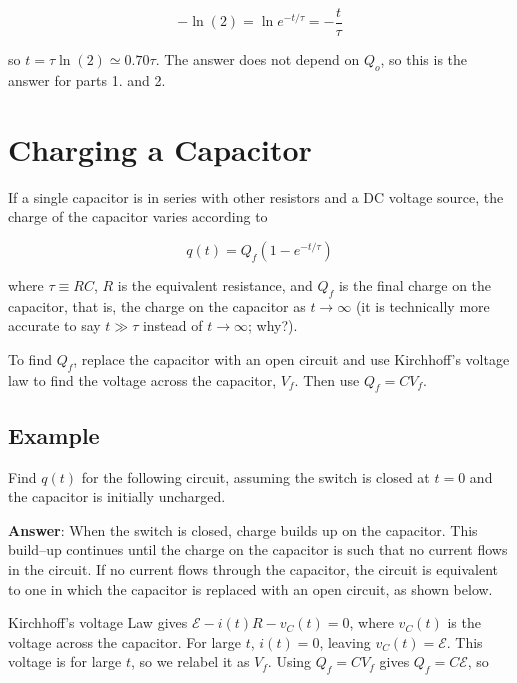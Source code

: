 \documentclass{article}
\begin{document}
\begin{equation}
-\ln(2) = \ln e^{-t/\tau} = -\frac{t}{\tau}
\end{equation}

so $t=\tau\ln(2)\simeq 0.70\tau$. The answer does not depend on $Q_o$, so this is the answer for parts 1. and 2.
\else

\newpage
\fi
\ifsolutions\else
\newpage
\fi

\section{Charging a Capacitor}

If a single capacitor is in series with other resistors and a DC voltage source, the charge of the capacitor varies according to 

\begin{equation}
q(t)=Q_f(1-e^{-t/\tau})
\end{equation}

where $\tau\equiv RC$, $R$ is the equivalent resistance, and $Q_f$ is the final charge on the capacitor, that is, the charge on the capacitor as $t\rightarrow\infty$ (it is technically more accurate to say $t\gg \tau$ instead of $t\rightarrow\infty$; why?).

To find $Q_f$, replace the capacitor with an open circuit and use Kirchhoff's voltage law to find the voltage across the capacitor, $V_f$. Then use $Q_f=CV_f$.

\subsection{Example}

Find $q(t)$ for the following circuit, assuming the switch is closed at $t=0$ and the capacitor is initially uncharged.



\textbf{Answer}: When the switch is closed, charge builds up on the capacitor. This build--up continues until the charge on the capacitor is such that no current flows in the circuit. If no current flows through the capacitor, the circuit is equivalent to one in which the capacitor is replaced with an open circuit, as shown below. 



Kirchhoff's voltage Law gives $\mathcal{E}-i(t)R-v_C(t)=0$, where $v_C(t)$ is the voltage across the capacitor. For large $t$, $i(t)=0$, leaving $v_{C}(t)=\mathcal{E}$. This voltage is for large $t$, so we relabel it as $V_f$. Using $Q_f=CV_f$ gives $Q_f=C\mathcal{E}$, so
\end{document}
